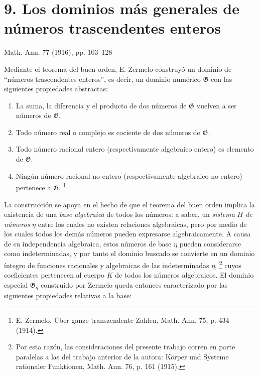 \section*{9. Los dominios más generales de números trascendentes enteros}
\begin{center}
Math. Ann. 77 (1916), pp. 103--128
\end{center}

Mediante el teorema del buen orden, E. Zermelo construyó un dominio de ``números trascendentes enteros'', es decir, un dominio numérico $\mathfrak G$ con las siguientes propiedades abstractas:
\begin{enumerate}
\item[I.] La suma, la diferencia y el producto de dos números de $\mathfrak G$ vuelven a ser números de $\mathfrak G$.
\item[II.] Todo número real o complejo es cociente de dos números de $\mathfrak G$.
\item[III.] Todo número racional entero (respectivamente algebraico entero) es elemento de $\mathfrak G$.
\item[IV.] Ningún número racional no entero (respectivamente algebraico no entero) pertenece a $\mathfrak G$.
\footnote{E. Zermelo, Über ganze transzendente Zahlen, Math. Ann. 75, p. 434 (1914).}
\end{enumerate}

La construcción se apoya en el hecho de que el teorema del buen orden implica la existencia de una \emph{base algebraica} de todos los números: a saber, un \emph{sistema} $H$ \emph{de números} $\eta$ entre los cuales no existen relaciones algebraicas, pero por medio de los cuales todos los demás números pueden expresarse algebraicamente. A causa de su independencia algebraica, estos números de base $\eta$ pueden considerarse como indeterminadas, y por tanto el dominio buscado se convierte en un dominio íntegro de funciones racionales y algebraicas de las indeterminadas $\eta$,
\footnote{Por esta razón, las consideraciones del presente trabajo corren en parte paralelas a las del trabajo anterior de la autora: Körper und Systeme rationaler Funktionen, Math. Ann. 76, p. 161 (1915).}
cuyos coeficientes pertenecen al cuerpo $K$ de todos los números algebraicos. El dominio especial $\mathfrak G_\eta$ construido por Zermelo queda entonces caracterizado por las siguientes propiedades relativas a la base:

